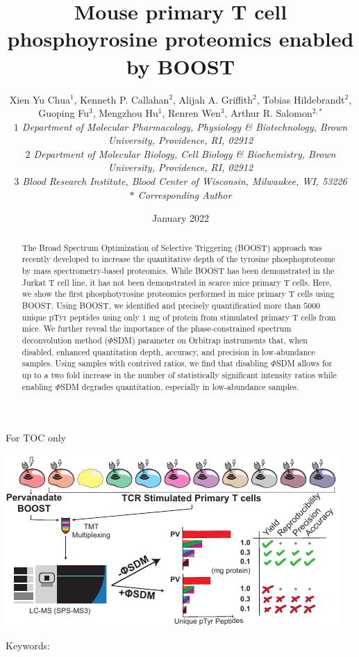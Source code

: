 \documentclass[journal=jprobs,manuscript=article]{achemso}
\title{Mouse primary T cell phosphoyrosine proteomics enabled by BOOST}
\author{Xien Yu Chua$^{1}$, Kenneth P. Callahan$^{2}$, Alijah A. Griffith$^{2}$, Tobias Hildebrandt$^{2}$, Guoping Fu$^{3}$, Mengzhou Hu$^{1}$, Renren Wen$^{3}$, Arthur R. Salomon$^{2,*}$
\\
\singlespacing
\textit{\small{$1$ Department of Molecular Pharmacology, Physiology \& Biotechnology, Brown University, Providence, RI, 02912}}
\\
\textit{\small{$2$ Department of Molecular Biology, Cell Biology \& Biochemistry, Brown University, Providence, RI, 02912}}
\\
\textit{\small{$3$ Blood Research Institute, Blood Center of Wisconsin, Milwaukee, WI, 53226}}
\\
\textit{\small{$*$} Corresponding Author}\tiny}
\date{January 2022}
\begin{document}
\maketitle

\begin{tocentry}

For TOC only

\includegraphics{figures/graphical_toc/mouse_turbotmt_gtoc.pdf}
\end{tocentry}


\begin{abstract}

The Broad Spectrum Optimization of Selective Triggering (BOOST) approach was recently developed to increase the quantitative depth of the tyrosine phosphoproteome by mass spectrometry-based proteomics. While BOOST has been demonstrated in the Jurkat T cell line, it has not been demonstrated in scarce mice primary T cells. Here, we show the first phosphotyrosine proteomics performed in mice primary T cells using BOOST. Using BOOST, we identified and precisely quantificatied more than $5000$ unique pTyr peptides using only $1$ mg of protein from stimulated primary T cells from mice. We further reveal the importance of the phase-constrained spectrum deconvolution method ($\Phi$SDM) parameter on Orbitrap instruments that, when disabled, enhanced quantitation depth, accuracy, and precision in low-abundance samples. Using samples with contrived ratios, we find that disabling $\Phi$SDM allows for up to a two fold increase in the number of statistically significant intensity ratios while enabling $\Phi$SDM degrades quantitation, especially in low-abundance samples.


\end{abstract}

Keywords:
\end{document}
